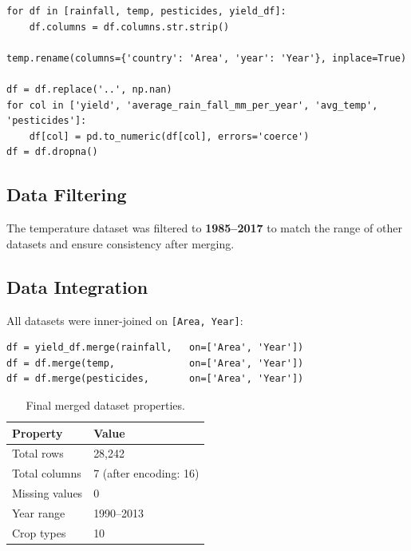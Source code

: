 \documentclass[12pt,a4paper]{article}
\begin{document}
\begin{lstlisting}[caption={Column standardisation and cleaning.}]
for df in [rainfall, temp, pesticides, yield_df]:
    df.columns = df.columns.str.strip()

temp.rename(columns={'country': 'Area', 'year': 'Year'}, inplace=True)

df = df.replace('..', np.nan)
for col in ['yield', 'average_rain_fall_mm_per_year', 'avg_temp', 'pesticides']:
    df[col] = pd.to_numeric(df[col], errors='coerce')
df = df.dropna()
\end{lstlisting}

\subsection{Data Filtering}
The temperature dataset was filtered to \textbf{1985--2017} to match the range
of other datasets and ensure consistency after merging.

\subsection{Data Integration}
All datasets were inner-joined on \texttt{[Area, Year]}:

\noindent\begin{minipage}{\linewidth}
\begin{lstlisting}[caption={Merging all datasets.}]
df = yield_df.merge(rainfall,   on=['Area', 'Year'])
df = df.merge(temp,             on=['Area', 'Year'])
df = df.merge(pesticides,       on=['Area', 'Year'])
\end{lstlisting}
\end{minipage}

\begin{table}[H]
\centering
\caption{Final merged dataset properties.}
\renewcommand{\arraystretch}{1.3}
\begin{tabular}{ll}
\toprule
\rowcolor{primary}
\color{white}\textbf{Property} & \color{white}\textbf{Value} \\
\midrule
\rowcolor{lightgrey}
Total rows     & 28,242 \\
Total columns  & 7 (after encoding: 16) \\
\rowcolor{lightgrey}
Missing values & 0 \\
Year range     & 1990--2013 \\
\rowcolor{lightgrey}
Crop types     & 10 \\
\bottomrule
\end{tabular}
\end{table}
\end{document}
